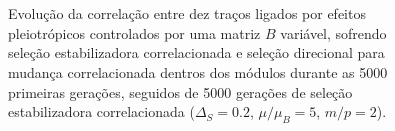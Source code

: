 \begin{center}
\begin{figure}[htbp]
  \\
  \vspace{-18pt}
  \vspace{11pt}
  \\
  \caption{Evolução da correlação entre dez traços ligados por efeitos
  pleiotrópicos controlados por uma matriz $B$ variável, sofrendo seleção estabilizadora correlacionada e seleção
  direcional para mudança correlacionada dentros dos módulos
  durante as 5000 primeiras gerações, seguidos de 5000 gerações de
  seleção estabilizadora correlacionada ($\Delta_S = 0.2$, $\mu/\mu_B=5$, $m/p=2$).}
  \label{posselecao}
\end{figure}
\end{center}

